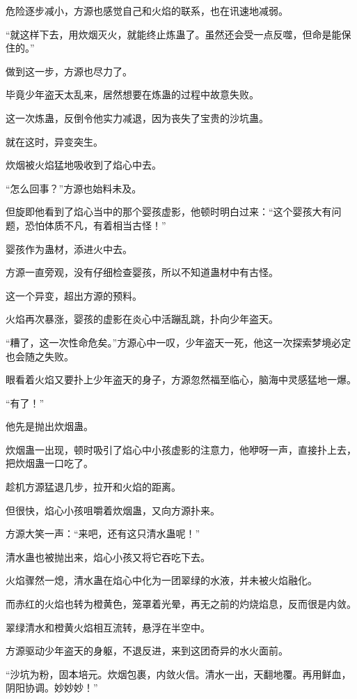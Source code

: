 \begin{this_body}
危险逐步减小，方源也感觉自己和火焰的联系，也在讯速地减弱。

“就这样下去，用炊烟灭火，就能终止炼蛊了。虽然还会受一点反噬，但命是能保住的。”

做到这一步，方源也尽力了。

毕竟少年盗天太乱来，居然想要在炼蛊的过程中故意失败。

这一次炼蛊，反倒令他实力减退，因为丧失了宝贵的沙坑蛊。

就在这时，异变突生。

炊烟被火焰猛地吸收到了焰心中去。

“怎么回事？”方源也始料未及。

但旋即他看到了焰心当中的那个婴孩虚影，他顿时明白过来：“这个婴孩大有问题，恐怕体质不凡，有着相当古怪！”

婴孩作为蛊材，添进火中去。

方源一直旁观，没有仔细检查婴孩，所以不知道蛊材中有古怪。

这一个异变，超出方源的预料。

火焰再次暴涨，婴孩的虚影在炎心中活蹦乱跳，扑向少年盗天。

“糟了，这一次性命危矣。”方源心中一叹，少年盗天一死，他这一次探索梦境必定也会随之失败。

眼看着火焰又要扑上少年盗天的身子，方源忽然福至临心，脑海中灵感猛地一爆。

“有了！”

他先是抛出炊烟蛊。

炊烟蛊一出现，顿时吸引了焰心中小孩虚影的注意力，他咿呀一声，直接扑上去，把炊烟蛊一口吃了。

趁机方源猛退几步，拉开和火焰的距离。

但很快，焰心小孩咀嚼着炊烟蛊，又向方源扑来。

方源大笑一声：“来吧，还有这只清水蛊呢！”

清水蛊也被抛出来，焰心小孩又将它吞吃下去。

火焰骤然一熄，清水蛊在焰心中化为一团翠绿的水液，并未被火焰融化。

而赤红的火焰也转为橙黄色，笼罩着光晕，再无之前的灼烧焰息，反而很是内敛。

翠绿清水和橙黄火焰相互流转，悬浮在半空中。

方源驱动少年盗天的身躯，不退反进，来到这团奇异的水火面前。

“沙坑为粉，固本培元。炊烟包裹，内敛火信。清水一出，天翻地覆。再用鲜血，阴阳协调。妙妙妙！”


\end{this_body}
